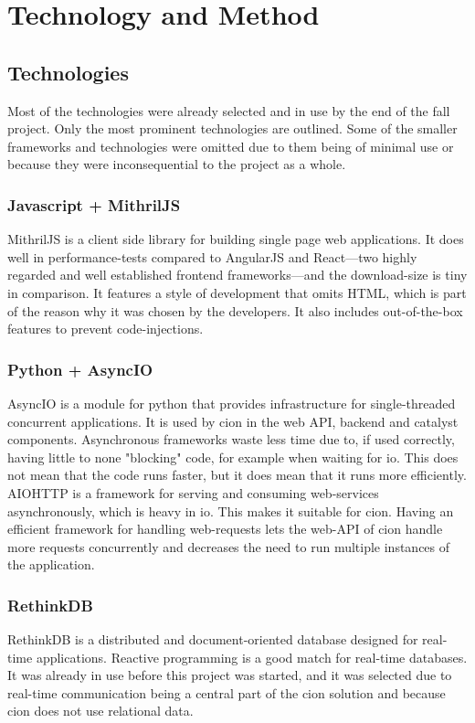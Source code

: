 \chapter{Technology and Method}
\label{chap:process}

\section{Technologies}
Most of the technologies were already selected and in use by the end of the fall project. Only the most prominent technologies are outlined. Some of the smaller frameworks and technologies were omitted due to them being of minimal use or because they were inconsequential to the project as a whole.

\subsection{Javascript + MithrilJS}
MithrilJS is a client side library for building single page web applications\cite{mithriljs}. It does well in performance-tests compared to AngularJS and React---two highly regarded and well established frontend frameworks---and the download-size is tiny in comparison\cite{mithril-framework-comparison}. It features a style of development that omits HTML, which is part of the reason why it was chosen by the developers. It also includes out-of-the-box features to prevent code-injections.

\subsection{Python + AsyncIO}
AsyncIO is a module for python that provides infrastructure for single-threaded concurrent applications\cite{python-asyncio}. It is used by cion in the web API, backend and catalyst components. Asynchronous frameworks waste less time due to, if used correctly, having little to none "blocking" code, for example when waiting for \acrfull{io}. This does not mean that the code runs faster, but it does mean that it runs more efficiently.
AIOHTTP is a framework for serving and consuming web-services asynchronously, which is heavy in \acrshort{io}. This makes it suitable for cion. Having an efficient framework for handling web-requests lets the web-API of cion handle more requests concurrently and decreases the need to run multiple instances of the application. 

\subsection{RethinkDB}
RethinkDB is a distributed and document-oriented database designed for real-time applications\cite{rethinkdb}. Reactive programming is a good match for real-time databases. It was already in use before this project was started, and it was selected due to real-time communication being a central part of the cion solution and because cion does not use relational data. 

